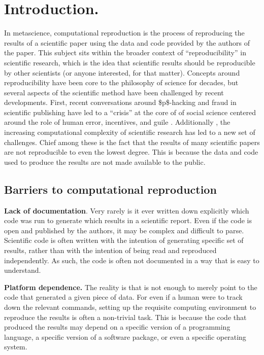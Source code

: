 
\hypertarget{introduction.}{%
\section{Introduction.}\label{introduction.}}

In metascience, computational reproduction is the process of reproducing the results of a scientific paper using the data and code provided by the authors of the paper. This subject sits within the broader context of ``reproducibility'' in scientific  research, which is the idea that scientific results should be reproducible by other scientists (or anyone interested, for that matter). Concepts around reproducibility have been core to the philosophy of science for decades, but several aspects of the scientific method have been challenged by recent developments. 
First, recent conversations around \$p\$-hacking and fraud in scientific publishing have led to a ``crisis'' at the core of of social science centered around the role of human error, incentives, and guile    . 
Additionally , the increasing computational complexity of scientific research has led to a new set of challenges. Chief among these is the fact that the results of many scientific papers are not reproducible to even the lowest degree. This is because the data and code used to produce the results are not made available to the public.


\hypertarget{barriers-to-computational-reproduction}{%
\subsection{Barriers to computational reproduction}\label{barriers-to-computational-reproduction}}

\textbf{Lack of documentation}. Very rarely is it ever written down explicitly which code was run to generate which results in a scientific report. Even if the code is open and published by the authors, it may be complex and difficult to parse. Scientific code is often written with the intention of generating specific set of results, rather than with the intention of being read and reproduced independently. As such, the code is often not documented in a way that is easy to understand.

\textbf{Platform dependence.} The reality is that is not enough to merely point to the code that generated a given piece of data. For even if a human were to track down the relevant commands, setting up the requisite computing environment to reproduce the results is often a non-trivial task. This is because the code that produced the results may depend on a specific version of a programming language, a specific version of a software package, or even a specific operating system.

